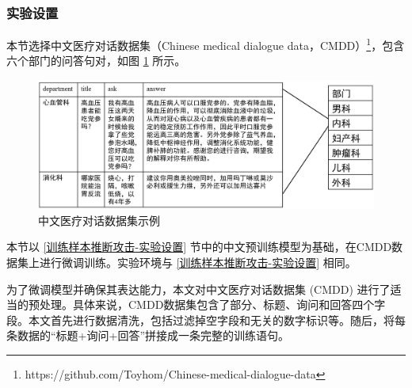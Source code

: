 \subsubsection{实验设置} \label{chap3_exp_setting}



本节选择中文医疗对话数据集（Chinese medical dialogue data，CMDD）\footnote{https://github.com/Toyhom/Chinese-medical-dialogue-data}，包含六个部门的问答句对，如图 \ref{CMDD_Data} 所示。

\begin{figure}[h]
	\centering
	\includegraphics[width=\linewidth]{figures/CMDD_Data.png}
	\caption{中文医疗对话数据集示例}
	\label{CMDD_Data}
\end{figure}



本节以 \ref{训练样本推断攻击-实验设置} 节中的中文预训练模型为基础，在CMDD数据集上进行微调训练。实验环境与 \ref{训练样本推断攻击-实验设置} 相同。

为了微调模型并确保其表达能力，本文对中文医疗对话数据集 (CMDD) 进行了适当的预处理。具体来说，CMDD数据集包含了部分、标题、询问和回答四个字段。本文首先进行数据清洗，包括过滤掉空字段和无关的数字标识等。随后，将每条数据的“标题+询问+回答”拼接成一条完整的训练语句。

